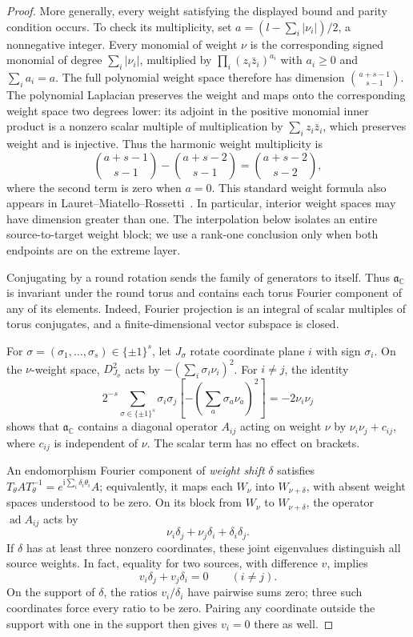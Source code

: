 \begin{proof}
More generally, every weight satisfying the displayed bound and parity
condition occurs.  To check its multiplicity, set
\(a=(l-\sum_i|\nu_i|)/2\), a nonnegative integer.
Every monomial of weight \(\nu\) is the corresponding signed monomial
of degree \(\sum_i|\nu_i|\), multiplied by
\(\prod_i(z_i\bar z_i)^{a_i}\) with \(a_i\ge0\) and
\(\sum_i a_i=a\).  The full polynomial weight space therefore has
dimension \(\binom{a+s-1}{s-1}\).
The polynomial Laplacian preserves the weight and maps onto the
corresponding weight space two degrees lower: its adjoint in the
positive monomial inner product is a nonzero scalar multiple of
multiplication by \(\sum_i z_i\bar z_i\), which preserves weight and
is injective.  Thus the harmonic weight multiplicity is
\[
 \binom{a+s-1}{s-1}-\binom{a+s-2}{s-1}
 =\binom{a+s-2}{s-2},
\]
where the second term is zero when \(a=0\).
This standard weight formula also appears in
Lauret--Miatello--Rossetti~\cite[Lemma~3.6]{LauretMiatelloRossetti}.
In particular, interior weight spaces may have dimension greater than
one.  The interpolation below isolates an entire source-to-target
weight block; we use a rank-one conclusion only when both endpoints
are on the extreme layer.

Conjugating by a round rotation sends the family of generators to
itself.  Thus \(\mathfrak a_{\mathbb C}\) is invariant under the round
torus and contains each torus Fourier component of any of its
elements.  Indeed, Fourier projection is an integral of scalar
multiples of torus conjugates, and a finite-dimensional vector
subspace is closed.

For \(\sigma=(\sigma_1,\ldots,\sigma_s)\in\{\pm1\}^s\), let \(J_\sigma\)
rotate coordinate plane \(i\) with sign \(\sigma_i\).  On the
\(\nu\)-weight space, \(D_{J_\sigma}^2\) acts by
\(-(\sum_i\sigma_i\nu_i)^2\).  For \(i\ne j\), the identity
\[
 2^{-s}\sum_{\sigma\in\{\pm1\}^s}
 \sigma_i\sigma_j\left[-\left(\sum_a\sigma_a\nu_a\right)^2\right]
 =-2\nu_i\nu_j
\]
shows that \(\mathfrak a_{\mathbb C}\) contains a diagonal operator
\(A_{ij}\) acting on weight \(\nu\) by \(\nu_i\nu_j+c_{ij}\), where
\(c_{ij}\) is independent of \(\nu\).  The scalar term has no effect
on brackets.

An endomorphism Fourier component of \emph{weight shift} \(\delta\)
satisfies \(T_\theta A T_\theta^{-1}
=e^{\mathrm i\sum_i\delta_i\theta_i}A\); equivalently, it maps each
\(W_\nu\) into \(W_{\nu+\delta}\), with absent weight spaces understood
to be zero.  On its block from \(W_\nu\) to \(W_{\nu+\delta}\), the
operator \(\operatorname{ad}A_{ij}\) acts by
\begin{equation}
 \nu_i\delta_j+\nu_j\delta_i+\delta_i\delta_j.
 \label{eq:control-block-eigenvalues}
\end{equation}
If \(\delta\) has at least three nonzero coordinates, these joint
eigenvalues distinguish all source weights.  In fact, equality for
two sources, with difference \(v\), implies
\[
 v_i\delta_j+v_j\delta_i=0\qquad(i\ne j).
\]
On the support of \(\delta\), the ratios \(v_i/\delta_i\) have
pairwise sums zero; three such coordinates force every ratio to be
zero.  Pairing any coordinate outside the support with one in the
support then gives \(v_i=0\) there as well.


\end{proof}
